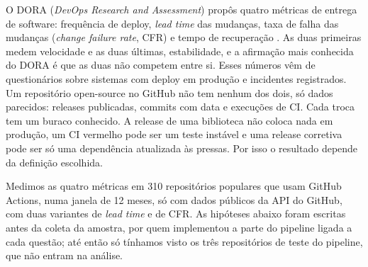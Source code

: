 \documentclass[12pt]{article}
\begin{document}
O DORA (\textit{DevOps Research and Assessment}) propôs quatro métricas de entrega de software:
frequência de deploy, \textit{lead time} das mudanças, taxa de falha das mudanças (\textit{change
failure rate}, CFR) e tempo de recuperação \cite{forsgren2018accelerate,dora2024}. As duas primeiras
medem velocidade e as duas últimas, estabilidade, e a afirmação mais conhecida do DORA é que as duas
não competem entre si. Esses números vêm de questionários sobre sistemas com deploy em produção e
incidentes registrados. Um repositório open-source no GitHub não tem nenhum dos dois, só dados
parecidos: releases publicadas, commits com data e execuções de CI. Cada troca tem um buraco
conhecido. A release de uma biblioteca não coloca nada em produção, um CI vermelho pode ser um teste
instável e uma release corretiva pode ser só uma dependência atualizada às pressas. Por isso o
resultado depende da definição escolhida.

Medimos as quatro métricas em 310 repositórios populares que usam GitHub Actions, numa janela de 12
meses, só com dados públicos da API do GitHub, com duas variantes de \textit{lead time} e de CFR.
As hipóteses abaixo foram escritas antes da coleta da amostra, por quem implementou a parte do
pipeline ligada a cada questão; até então só tínhamos visto os três repositórios de teste do
pipeline, que não entram na análise.
\end{document}
